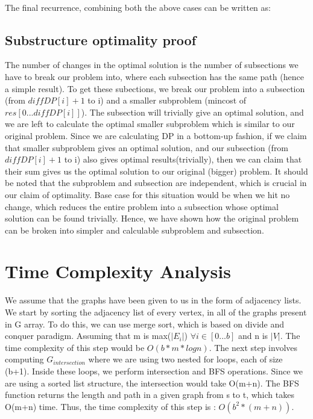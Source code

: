 \documentclass{article}
\begin{document}
\vspace{2mm}
\\
The final recurrence, combining both the above cases can be written as:
\begin{center}
\end{center}

\subsection{Substructure optimality proof}

The number of changes in the optimal solution is the number of subsections we have to break our problem into, where each subsection has the same path (hence a simple result). To get these subections, we break our problem into a subsection (from $diffDP[i]+1$ to i) and a smaller subproblem (mincost of $res[0...diffDP[i]]$). The subsection will trivially give an optimal solution, and we are left to calculate the optimal smaller subproblem which is similar to our original problem. Since we are calculating DP in a bottom-up fashion, if we claim that smaller subproblem gives an optimal solution, and our subsection (from $diffDP[i]+1$ to i) also gives optimal results(trivially), then we can claim that their sum gives us the optimal solution to our original (bigger) problem. It should be noted that the subproblem and subsection are independent, which is crucial in our claim of optimality. Base case for this situation would be when we hit no change, which reduces the entire problem into a subsection whose optimal solution can be found trivially. Hence, we have shown how the original problem can be broken into simpler and calculable subproblem and subsection.


\section {Time Complexity Analysis}
We assume that the graphs have been given to us in the form of adjacency lists. We start by sorting the adjacency list of every vertex, in all of the graphs present in G array. To do this, we can use merge sort, which is based on divide and conquer paradigm. Assuming that m is max($|E_{i}|$) $\forall i \in [0...b]$ and n is $|V|$. The time complexity of this step would be $O(b*m*log n)$. The next step involves computing $G_{intersection}$ where we are using two nested for loops, each of size (b+1). Inside these loops, we perform intersection and BFS operations. Since we are using a sorted list structure, the intersection would take O(m+n). The BFS function returns the length and path in a given graph from s to t, which takes O(m+n) time.  Thus, the time complexity of this step is : $O(b^{2}*(m+n))$.
\begin{center}
\end{center}
\end{document}
